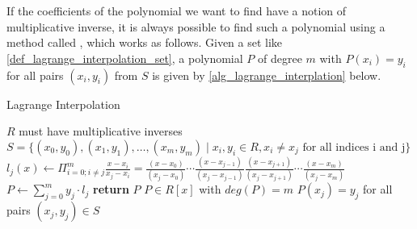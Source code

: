 If the coefficients of the polynomial we want to find have a notion of multiplicative inverse, it is always possible to find such a polynomial using a method called , which works as follows. Given a set like \ref{def_lagrange_interpolation_set}, a polynomial $P$ of degree $m$ with $P(x_i)=y_i$ for all pairs $(x_i,y_i)$ from $S$ is given by \algname{} \ref{alg_lagrange_interplation} below.

\begin{algorithm}\caption{Lagrange Interpolation}
\label{alg_lagrange_interplation}
\begin{algorithmic}[0]
\Require $R$ must have multiplicative inverses
\Require $S= \{(x_0,y_0), (x_1,y_1),\ldots,(x_m,y_m)\;|\; x_i,y_i\in R, x_i\neq x_j\text{ for all indices i and j}\}$
\State  $l_j(x) \gets \Pi_{i=0;i\neq j}^{m}\frac{x-x_i}{x_j-x_i} = \frac{(x-x_0)}{(x_j-x_0)} \cdots \frac{(x-x_{j-1})}{(x_j-x_{j - 1})} \frac{(x-x_{j+1})}{(x_j-x_{j+1})} \cdots \frac{(x-x_m)}{(x_j-x_m)}$
\EndFor
\State $P\gets \sum_{j=0}^m y_j\cdot l_j$
\State \textbf{return} $P$
\EndProcedure
\Ensure $P\in R[x]$ with $deg(P)=m$
\Ensure $P(x_j)=y_j$ for all pairs $(x_j,y_j)\in S$
\end{algorithmic}
\end{algorithm}

